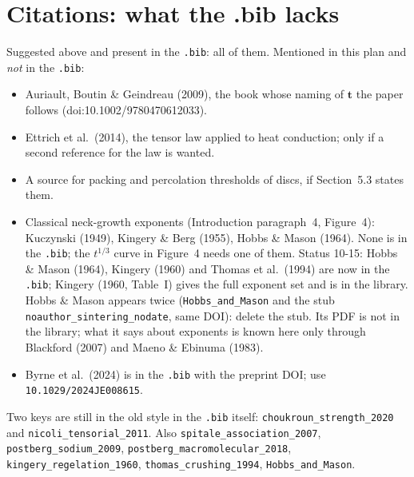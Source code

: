\documentclass[11pt]{article}
\newcommand{\add}[1]{\textcolor{revX}{#1}}
\begin{document}
\section*{Citations: what the .bib lacks}
Suggested above and present in the \texttt{.bib}: all of them. Mentioned in
this plan and \emph{not} in the \texttt{.bib}:
\begin{itemize}
\item Auriault, Boutin \& Geindreau (2009), the book whose naming of
  $\mathbf{t}$ the paper follows (doi:10.1002/9780470612033).
\item Ettrich et al.\ (2014), the tensor law applied to heat conduction;
  only if a second reference for the law is wanted.
\item A source for packing and percolation thresholds of discs, if
  Section~5.3 states them.
\item Classical neck-growth exponents (Introduction paragraph~4,
  Figure~4): Kuczynski (1949), Kingery \& Berg (1955), Hobbs \& Mason
  (1964). None is in the \texttt{.bib}; the $t^{1/3}$ curve in Figure~4
  needs one of them.
  \add{Status 10-15: Hobbs \& Mason (1964), Kingery (1960) and Thomas et
  al.\ (1994) are now in the \texttt{.bib}; Kingery (1960, Table~I) gives
  the full exponent set and is in the library. Hobbs \& Mason appears
  twice (\texttt{Hobbs\_and\_Mason} and the stub
  \texttt{noauthor\_sintering\_nodate}, same DOI): delete the stub. Its
  PDF is not in the library; what it says about exponents is known here
  only through Blackford (2007) and Maeno \& Ebinuma (1983).}
\item \add{Byrne et al.\ (2024) is in the \texttt{.bib} with the preprint
  DOI; use \texttt{10.1029/2024JE008615}.}
\end{itemize}
Two keys are still in the old style in the \texttt{.bib} itself:
\texttt{choukroun\_strength\_2020} and \texttt{nicoli\_tensorial\_2011}.
\add{Also \texttt{spitale\_association\_2007},
\texttt{postberg\_sodium\_2009}, \texttt{postberg\_macromolecular\_2018},
\texttt{kingery\_regelation\_1960}, \texttt{thomas\_crushing\_1994},
\texttt{Hobbs\_and\_Mason}.}
\end{document}
